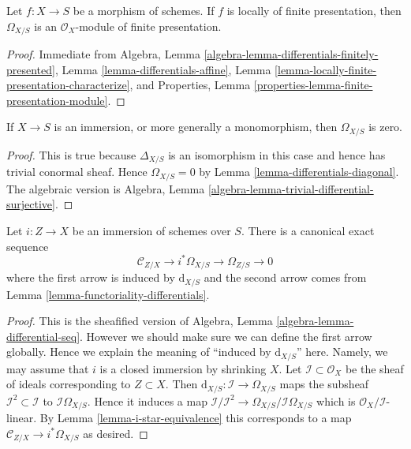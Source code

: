 \begin{lemma}
\label{lemma-finite-presentation-differentials}
Let $f : X \to S$ be a morphism of schemes.
If $f$ is locally of finite presentation, then $\Omega_{X/S}$ is
an $\mathcal{O}_X$-module of finite presentation.
\end{lemma}

\begin{proof}
Immediate from
Algebra, Lemma \ref{algebra-lemma-differentials-finitely-presented},
Lemma \ref{lemma-differentials-affine},
Lemma \ref{lemma-locally-finite-presentation-characterize}, and
Properties, Lemma \ref{properties-lemma-finite-presentation-module}.
\end{proof}

\begin{lemma}
\label{lemma-immersion-differentials}
If $X \to S$ is an immersion, or more generally a monomorphism, then
$\Omega_{X/S}$ is zero.
\end{lemma}

\begin{proof}
This is true because $\Delta_{X/S}$ is an isomorphism in this case
and hence has trivial conormal sheaf. Hence $\Omega_{X/S} = 0$
by Lemma \ref{lemma-differentials-diagonal}. The algebraic version is
Algebra, Lemma \ref{algebra-lemma-trivial-differential-surjective}.
\end{proof}

\begin{lemma}
\label{lemma-differentials-relative-immersion}
Let $i : Z \to X$ be an immersion of schemes over $S$.
There is a canonical exact sequence
$$
\mathcal{C}_{Z/X} \to i^*\Omega_{X/S} \to \Omega_{Z/S} \to 0
$$
where the first arrow is induced by $\text{d}_{X/S}$
and the second arrow comes from Lemma \ref{lemma-functoriality-differentials}.
\end{lemma}

\begin{proof}
This is the sheafified version of
Algebra, Lemma \ref{algebra-lemma-differential-seq}. However
we should make sure we can define the first arrow globally.
Hence we explain the meaning of ``induced by $\text{d}_{X/S}$'' here.
Namely, we may assume that $i$ is a closed immersion by
shrinking $X$. Let $\mathcal{I} \subset \mathcal{O}_X$
be the sheaf of ideals corresponding to $Z \subset X$.
Then $\text{d}_{X/S} : \mathcal{I} \to \Omega_{X/S}$
maps the subsheaf $\mathcal{I}^2 \subset \mathcal{I}$ to
$\mathcal{I}\Omega_{X/S}$. Hence it induces a map
$\mathcal{I}/\mathcal{I}^2 \to \Omega_{X/S}/\mathcal{I}\Omega_{X/S}$
which is $\mathcal{O}_X/\mathcal{I}$-linear.
By Lemma \ref{lemma-i-star-equivalence} this corresponds to a map
$\mathcal{C}_{Z/X} \to i^*\Omega_{X/S}$ as desired.
\end{proof}

